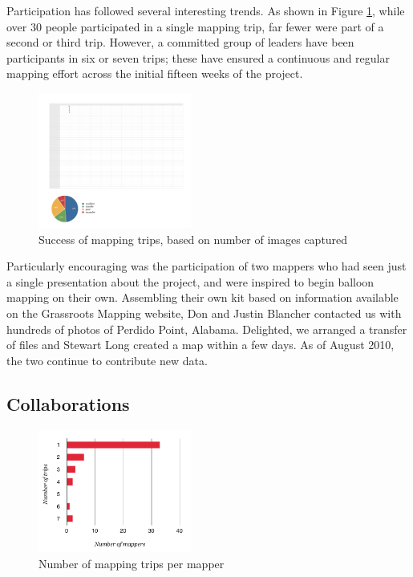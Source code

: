 \documentclass[11pt,oneside,notitlepage]{report}
\begin{document}
{{Participation has followed several interesting trends. As shown in Figure \ref{fig:tripspermapper}, while over 30 people participated in a single mapping trip, far fewer were part of a second or third trip. However, a committed group of leaders have been participants in six or seven trips; these have ensured a continuous and regular mapping effort across the initial fifteen weeks of the project. 

\begin{figure}
	\begin{flushright}
		\includegraphics[width=0.45\textwidth]{diagrams/gulf-trip-success.pdf}
		\caption{Success of mapping trips, based on number of images captured}
	\end{flushright}
\end{figure}

Particularly encouraging was the participation of two mappers who had seen just a single presentation about the project, and were inspired to begin balloon mapping on their own. Assembling their own kit based on information available on the Grassroots Mapping website, Don and Justin Blancher contacted us with hundreds of photos of Perdido Point, Alabama. Delighted, we arranged a transfer of files and Stewart Long created a map within a few days. As of August 2010, the two continue to contribute new data.  
 
\subsection{Collaborations}

\begin{figure}
	\label{fig:tripspermapper}
	\begin{flushright}
		\includegraphics[width=0.45\textwidth]{diagrams/mappers-histogram.pdf}
		\caption{Number of mapping trips per mapper}
	\end{flushright}
\end{figure}

}}
\end{document}
